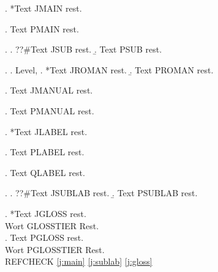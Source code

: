

\ex. *Text JMAIN rest.

\ex. Text PMAIN rest.

\ex.
\a. ??\#Text JSUB rest.
\b. Text PSUB rest.

\ex.
\a. Level,
\a. *Text JROMAN rest.
\b. Text PROMAN rest.

\ex. \jdg{\dag}Text JMANUAL rest.

\ex. Text PMANUAL rest.

\ex. \label{j:main}*Text JLABEL rest.

\ex. Text PLABEL rest.

\ex. \label{j:nomark}Text QLABEL rest.

\ex.
\a. ??\#Text JSUBLAB rest.
\b. Text PSUBLAB rest.

\exg. \label{j:gloss}*Text JGLOSS rest.\\
Wort GLOSSTIER Rest.\\

\exg. Text PGLOSS rest.\\
Wort PGLOSSTIER Rest.\\

REFCHECK \ref{j:main} \ref{j:sublab} \ref{j:gloss} 

